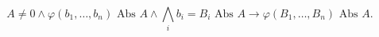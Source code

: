 $$A \neq 0 \wedge \varphi(b_1,\dots,b_n) \text{ Abs } A \wedge \bigwedge_i b_i = B_i \text{ Abs } A \rightarrow \varphi(B_1,\dots,B_n) \text{ Abs } A.$$